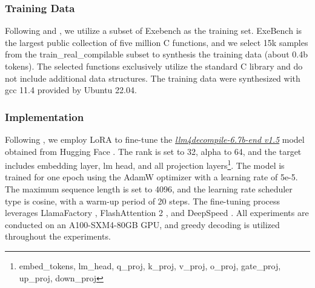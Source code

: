 
\subsubsection{Training Data}
Following \citet{llm4decompile} and \citet{feng2024self}, we utilize a subset of Exebench \citep{exebench} as the training set.
ExeBench is the largest public collection of five million C functions, and we select 15k samples from the train\_real\_compilable subset to synthesis the training data (about 0.4b tokens). The selected functions exclusively utilize the standard C library and do not include additional data structures. The training data were synthesized with gcc 11.4 provided by Ubuntu 22.04.

\subsubsection{Implementation} 

Following \citet{feng2024self}, we employ LoRA \citep{hu2022lora} to fine-tune the \textit{\href{https://huggingface.co/LLM4Binary/llm4decompile-6.7b-v1.5}{llm4decompile-6.7b-end v1.5}} model obtained from Hugging Face \citep{huggingface}.
The rank is set to 32, alpha to 64, and the target includes embedding layer, lm head, and all projection layers\footnote{embed\_tokens, lm\_head, q\_proj, k\_proj, v\_proj, o\_proj, gate\_proj, up\_proj, down\_proj}.
The model is trained for one epoch using the AdamW optimizer \citep{adamw} with a learning rate of 5e-5.
The maximum sequence length is set to 4096, and the learning rate scheduler type is cosine, with a warm-up period of 20 steps. 
The fine-tuning process leverages LlamaFactory \citep{llamafactory}, FlashAttention 2 \citep{flashattention2}, and DeepSpeed \citep{wang2024zero}. All experiments are conducted on an A100-SXM4-80GB GPU, and greedy decoding is utilized throughout the experiments.

